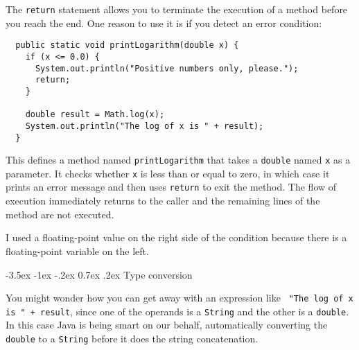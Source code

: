 \documentclass{book}
\makeatletter
\renewcommand{\section}{\@startsection 
    {section} {1} {0mm}%
    {-3.5ex \@plus -1ex \@minus -.2ex}%
    {0.7ex \@plus.2ex}%
    {\normalfont\Large\bfseries}}
\makeatother
\begin{document}
The {\tt return} statement allows you to terminate the execution
of a method before you reach the end.  One reason to use it
is if you detect an error condition:

\begin{verbatim}
  public static void printLogarithm(double x) {
    if (x <= 0.0) {
      System.out.println("Positive numbers only, please.");
      return;
    }

    double result = Math.log(x);
    System.out.println("The log of x is " + result);
  }
\end{verbatim}
%
This defines a method named {\tt printLogarithm} that takes a
{\tt  double} named {\tt x} as a parameter.  It checks whether
{\tt  x} is less than or equal to zero, in which case it prints an error
message and then uses {\tt return} to exit the method.  The flow of
execution immediately returns to the caller and the remaining lines of
the method are not executed.

I used a floating-point value on the right side of the condition
because there is a floating-point variable on the left.


\section {Type conversion}

You might wonder how you can get away with an expression like {\tt
"The log of x is " + result}, since one of the operands is a {\tt String}
and the other is a {\tt double}.  In this case Java is being
smart on our behalf, automatically converting the {\tt double} to a
{\tt String} before it does the string concatenation.


\end{document}
